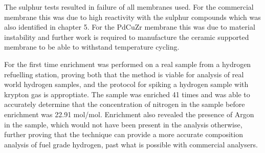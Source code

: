 The sulphur tests resulted in failure of all membranes used. For the commercial membrane this was due to high reactivity with the sulphur compounds which was also identified in chapter 5. For the PdCuZr membrane this was due to material instability and further work is required to manufacture the ceramic supported membrane to be able to withstand temperature cycling. 

For the first time enrichment was performed on a real sample from a hydrogen refuelling station, proving both that the method is viable for analysis of real world hydrogen samples, and the protocol for spiking a hydrogen sample with krypton gas is approptiate. The sample was enriched 41 times and was able to accurately determine that the concentration of nitrogen in the sample before enrichment was 22.91 \textmu mol/mol. Enrichment also revealed the presence of Argon in the sample, which would not have been present in the analysis otherwise, further proving that the technique can provide a more accurate composition analysis of fuel grade hydrogen, past what is possible with commercial analysers.


